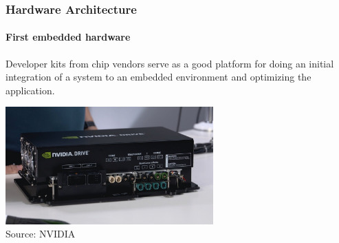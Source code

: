 \begin{frame}
\frametitle{Hardware Architecture}
\framesubtitle{First embedded hardware}
Developer kits from chip vendors serve as a good platform for doing an initial
integration of a system to an embedded environment and optimizing the
application.
\begin{center}
\includegraphics[width=0.6\textwidth]{images/nvidia_drive_agx.jpg}\\
\footnotesize Source: NVIDIA\footnotemark[1]
\end{center}    
\end{frame}

